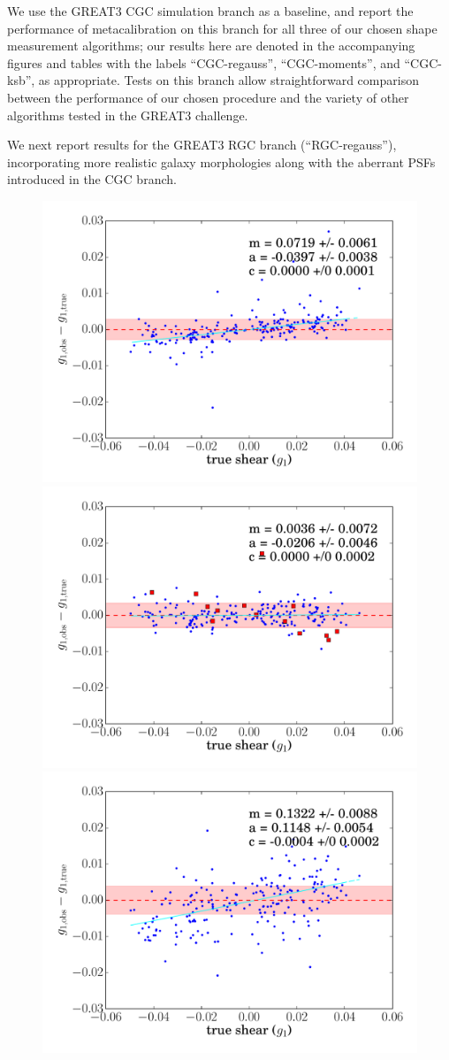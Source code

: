 \documentclass[iop]{emulateapj}
\newcommand\rmcomment[1]{\textcolor{red}{(RM: #1)}}
\begin{document}
We use the GREAT3 CGC simulation branch as a baseline, and report the
performance of metacalibration on this branch for all three of our
chosen shape measurement algorithms; our results here are denoted in
the accompanying figures and tables with the labels ``CGC-regauss'',
``CGC-moments'', and ``CGC-ksb'', as appropriate.  Tests on this branch allow
straightforward comparison between the performance of our chosen
procedure and the variety of other algorithms tested in the GREAT3
challenge.

We next report results for the GREAT3 RGC branch (``RGC-regauss''),
incorporating more realistic galaxy morphologies along with the
aberrant PSFs introduced in the CGC branch. 

\begin{figure}[t]
\begin{center}
\includegraphics[width=0.46\linewidth]{m1-no_corrections-regauss.pdf}
\includegraphics[width=0.46\linewidth]{m1-regauss-opt-shear_plots.pdf}\\
\includegraphics[width=0.46\linewidth]{m1-no_corrections-ksb.pdf}

\end{center}
\end{figure}
\end{document}
